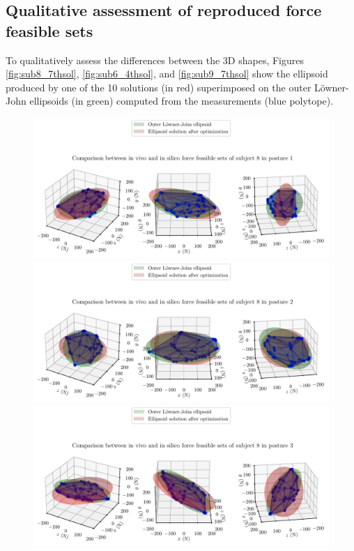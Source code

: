 \clearpage
\subsection*{Qualitative assessment of reproduced force feasible sets}
To qualitatively assess the differences between the 3D shapes, Figures \ref{fig:sub8_7thsol}, \ref{fig:sub6_4thsol}, and \ref{fig:sub9_7thsol} show the ellipsoid produced by one of the 10 solutions (in red) superimposed on the outer Löwner-John ellipsoids (in green) computed from the measurements (blue polytope).

\begin{figure}[!htb]
    \centering
    \captionsetup{justification=centering}
    \begin{minipage}{1\linewidth}
        \captionsetup{justification=centering}
        \centering
        \includegraphics[trim=0 0 0 60, clip, width=0.8\linewidth]{img/chapter_5/subject_163_solution_7_posture_1.pdf}
    \end{minipage}
    \hfill
    \begin{minipage}{1\linewidth}
        \captionsetup{justification=centering}
        \centering
        \includegraphics[trim=0 0 0 60, clip, width=0.8\linewidth]{img/chapter_5/subject_163_solution_7_posture_2.pdf}
    \end{minipage}
    \begin{minipage}{1\linewidth}
        \captionsetup{justification=centering}
        \centering
        \includegraphics[trim=0 0 0 60, clip, width=0.8\linewidth]{img/chapter_5/subject_163_solution_7_posture_3.pdf}

\end{minipage}
\end{figure}
